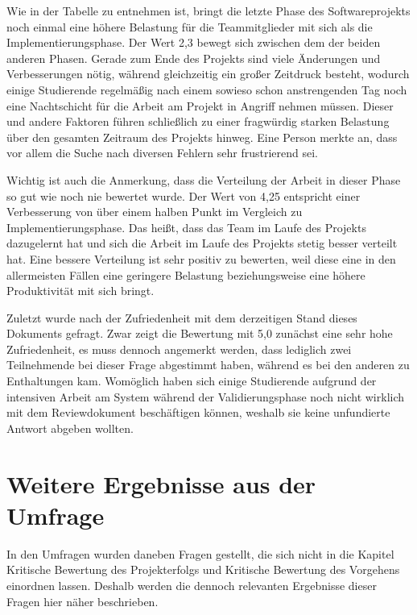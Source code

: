 \documentclass[../review_3.tex]{subfiles}
\begin{document}
Wie in der Tabelle zu entnehmen ist, bringt die letzte Phase des Softwareprojekts noch einmal eine höhere Belastung für die Teammitglieder mit sich als die Implementierungsphase. Der Wert 2,3 bewegt sich zwischen dem der beiden anderen Phasen. Gerade zum Ende des Projekts sind viele Änderungen und Verbesserungen nötig, während gleichzeitig ein großer Zeitdruck besteht, wodurch einige Studierende regelmäßig nach einem sowieso schon anstrengenden Tag noch eine Nachtschicht für die Arbeit am Projekt in Angriff nehmen müssen. Dieser und andere Faktoren führen schließlich zu einer fragwürdig starken Belastung über den gesamten Zeitraum des Projekts hinweg. Eine Person merkte an, dass vor allem die Suche nach diversen Fehlern sehr frustrierend sei.

Wichtig ist auch die Anmerkung, dass die Verteilung der Arbeit in dieser Phase so gut wie noch nie bewertet wurde. Der Wert von 4,25 entspricht einer Verbesserung von über einem halben Punkt im Vergleich zu Implementierungsphase. Das heißt, dass das Team im Laufe des Projekts dazugelernt hat und sich die Arbeit im Laufe des Projekts stetig besser verteilt hat. Eine bessere Verteilung ist sehr positiv zu bewerten, weil diese eine in den allermeisten Fällen eine geringere Belastung beziehungsweise eine höhere Produktivität mit sich bringt.

Zuletzt wurde nach der Zufriedenheit mit dem derzeitigen Stand dieses Dokuments gefragt. Zwar zeigt die Bewertung mit 5,0 zunächst eine sehr hohe Zufriedenheit, es muss dennoch angemerkt werden, dass lediglich zwei Teilnehmende bei dieser Frage abgestimmt haben, während es bei den anderen zu Enthaltungen kam. Womöglich haben sich einige Studierende aufgrund der intensiven Arbeit am System während der Validierungsphase noch nicht wirklich mit dem Reviewdokument beschäftigen können, weshalb sie keine unfundierte Antwort abgeben wollten.

\section{Weitere Ergebnisse aus der Umfrage}
In den Umfragen wurden daneben Fragen gestellt, die sich nicht in die Kapitel \glqq Kritische Bewertung des Projekterfolgs\grqq{} und \glqq Kritische Bewertung des Vorgehens\grqq{} einordnen lassen. Deshalb werden die dennoch relevanten Ergebnisse dieser Fragen hier näher beschrieben.
\end{document}
